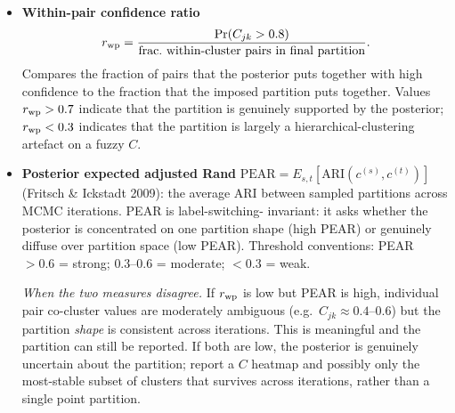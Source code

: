 \documentclass[11pt]{article}
\begin{document}
\begin{enumerate}[leftmargin=2em]
    \begin{itemize}[leftmargin=1em]
        \item \textbf{Within-pair confidence ratio}
        \[
            r_{\rm wp}=\frac{\Pr(C_{jk}>0.8)}
                  {\text{frac.\ within-cluster pairs in final partition}}.
        \]
        Compares the fraction of pairs that the posterior puts together
        with high confidence to the fraction that the imposed partition
        puts together.  Values $r_{\rm wp}>0.7$ indicate that the
        partition is genuinely supported by the posterior; $r_{\rm wp}<0.3$
        indicates that the partition is largely a hierarchical-clustering
        artefact on a fuzzy $C$.
        \item \textbf{Posterior expected adjusted Rand}
        $\mathrm{PEAR}=E_{s,t}[\mathrm{ARI}(c^{(s)},c^{(t)})]$
        (Fritsch \& Ickstadt 2009): the average ARI between sampled
        partitions across MCMC iterations.  PEAR is label-switching-
        invariant: it asks whether the posterior is concentrated on one
        partition shape (high PEAR) or genuinely diffuse over partition
        space (low PEAR).  Threshold conventions: PEAR $>0.6$ = strong;
        $0.3$--$0.6$ = moderate; $<0.3$ = weak.

        \emph{When the two measures disagree.}  If $r_{\rm wp}$ is low but
        PEAR is high, individual pair co-cluster values are moderately
        ambiguous (e.g.\ $C_{jk}\!\approx\!0.4$--$0.6$) but the partition
        \emph{shape} is consistent across iterations.  This is meaningful
        and the partition can still be reported.  If both are low, the
        posterior is genuinely uncertain about the partition; report a
        $C$ heatmap and possibly only the most-stable subset of clusters
        that survives across iterations, rather than a single point
        partition.
    \end{itemize}
\end{enumerate}
\end{document}
